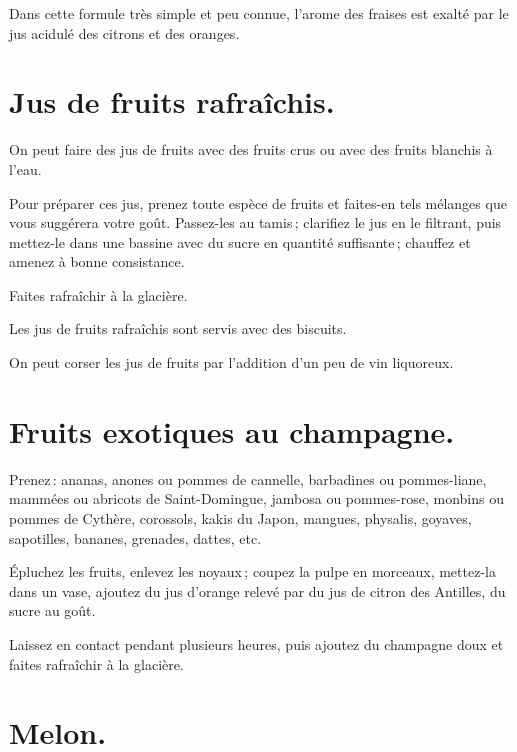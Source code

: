 Dans cette formule très simple et peu connue, l'arome des fraises est exalté
par le jus acidulé des citrons et des oranges.

\section*{\centering Jus de fruits rafraîchis.}
{}

On peut faire des jus de fruits avec des fruits crus ou avec des fruits
blanchis à l'eau.

Pour préparer ces jus, prenez toute espèce de fruits et faites-en tels mélanges
que vous suggérera votre goût. Passez-les au tamis ; clarifiez le jus en le
filtrant, puis mettez-le dans une bassine avec du sucre en quantité
suffisante ; chauffez et amenez à bonne consistance.

Faites rafraîchir à la glacière.

Les jus de fruits rafraîchis sont servis avec des biscuits.

\sk

On peut corser les jus de fruits par l'addition d'un peu de vin liquoreux.

\section*{\centering Fruits exotiques au champagne.}
{}

Prenez : ananas, anones ou pommes de cannelle, barbadines ou pommes-liane,
mammées ou abricots de Saint-Domingue, jambosa ou pommes-rose, monbins ou
pommes de Cythère, corossols, kakis du Japon, mangues, physalis, goyaves,
sapotilles, bananes, grenades, dattes, etc.

Épluchez les fruits, enlevez les noyaux ; coupez la pulpe en morceaux,
mettez-la dans un vase, ajoutez du jus d'orange relevé par du jus de citron des
Antilles, du sucre au goût.

Laissez en contact pendant plusieurs heures, puis ajoutez du champagne doux
et faites rafraîchir à la glacière.

\section*{\centering Melon.}
{}

